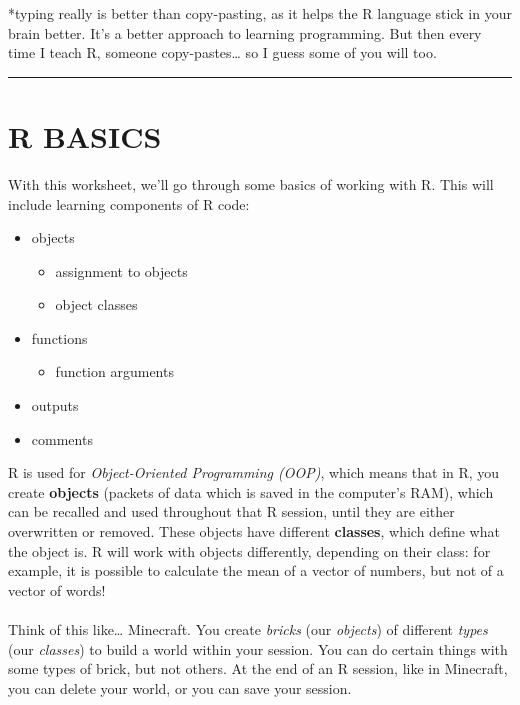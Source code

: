 \documentclass[
]{book}
\providecommand{\tightlist}{%
  \setlength{\itemsep}{0pt}\setlength{\parskip}{0pt}}
\begin{document}
*typing really is better than copy-pasting, as it helps the R language stick in your
brain better. It's a better approach to learning programming. But then every time I teach R,
someone copy-pastes\ldots{} so I guess some of you will too.

\begin{center}\rule{0.5\linewidth}{0.5pt}\end{center}

\hypertarget{r-basics-1}{%
\section{R BASICS}\label{r-basics-1}}

With this worksheet, we'll go through some basics of working with R. This will
include learning components of R code:

\begin{itemize}
\tightlist
\item
  objects

  \begin{itemize}
  \tightlist
  \item
    assignment to objects
  \item
    object classes
  \end{itemize}
\item
  functions

  \begin{itemize}
  \tightlist
  \item
    function arguments
  \end{itemize}
\item
  outputs
\item
  comments\\
\end{itemize}

R is used for \emph{Object-Oriented Programming (OOP)}, which means that in R, you
create \textbf{objects} (packets of data which is saved in the computer's RAM), which
can be recalled and used throughout that R session, until they are either
overwritten or removed. These objects have different \textbf{classes}, which define
what the object is. R will work with objects differently, depending on their
class: for example, it is possible to calculate the mean of a vector of numbers,
but not of a vector of words!\\
~\\

Think of this like\ldots{} Minecraft. You create \emph{bricks} (our \emph{objects})
of different \emph{types} (our \emph{classes}) to build a world within your session. You
can do certain things with some types of brick, but not others. At the
end of an R session, like in Minecraft, you can delete your world, or you can
save your session.\\
~\\
\end{document}

